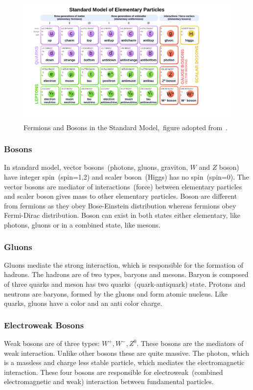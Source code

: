 \begin{figure}[h]
\centering
\includegraphics[scale=0.35]{chapter1/sm.png} 
\centering
\caption{Fermions and Bosons in the Standard Model,~figure adopted from~\cite{enwiki:1045150258}.}
\label{Fermions}
\end{figure}

\subsubsection{Bosons}
In standard model, vector bosons~(photons, gluons, graviton, $W$ and $Z$ boson) have integer spin~(spin=1,2) and scaler boson~(Higgs) has no spin~(spin=0). The vector bosons are mediator of interactions~(force) between elementary particles and scaler boson gives mass to other elementary particles. Boson are different from fermions as they obey Bose-Einstein distribution whereas fermions obey Fermi-Dirac distribution. Boson can exist in both states either elementary, like photons, gluons or in a combined state, like mesons.  
\subsubsection{Gluons}
Gluons mediate the strong interaction, which is responsible for the formation of hadrons. The hadrons are of two types, baryons and mesons. Baryon is composed of three quarks and meson has two quarks~(quark-antiquark)  state. Protons and neutrons are baryons, formed by the gluons and form atomic nucleus. Like quarks, gluons have a color and an anti color charge.
\subsubsection{Electroweak Bosons}
Weak bosons are of three types: $W^{+},W^{-},Z^{0}$. These bosons are the mediators of weak interaction. Unlike other bosons these are quite massive. The photon, which is a massless and charge less stable particle, which mediates the electromagnetic interaction. These four bosons are responsible for electroweak~(combined electromagnetic and weak) interaction between fundamental particles.
